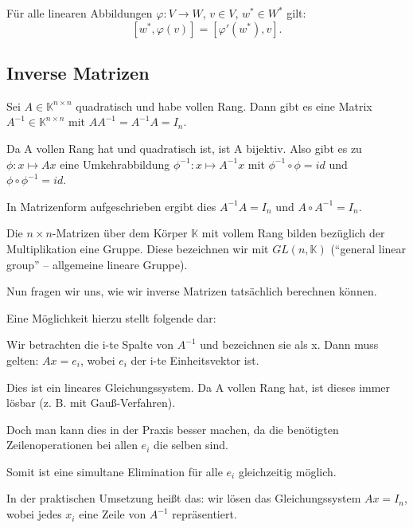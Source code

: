 \documentclass[10pt]{scrbook}
\begin{document}
\begin{Le}
Für alle linearen Abbildungen $\varphi: V\rightarrow W$, $v\in V$, $w^*\in W^*$ gilt:
\begin{equation}
\left[w^*, \varphi(v)\right] = \left[\varphi'(w^*), v\right].
\end{equation}
\end{Le}

\subsection{Inverse Matrizen}

\begin{Sa}
Sei $A\in\mathbb{K}^{n\times n}$ quadratisch und habe vollen Rang. Dann gibt es eine Matrix $A^{-1}\in\mathbb{K}^{n\times n}$ mit $A A^{-1}=A^{-1} A=I_n$.
\end{Sa}
\begin{bew}
Da A vollen Rang hat und quadratisch ist, ist A bijektiv. Also gibt es zu $\phi: x\mapsto A x$ eine Umkehrabbildung $\phi^{-1}: x\mapsto A^{-1} x$ mit $\phi^{-1} \circ \phi=id$ und  $\phi \circ \phi^{-1}=id$.

In Matrizenform aufgeschrieben ergibt dies $A^{-1} A=I_n$ und $A \circ A^{-1}=I_n$.
\end{bew}

\begin{Kor}
Die $n\times n$-Matrizen über dem Körper $\mathbb{K}$ mit vollem Rang bilden bezüglich der Multiplikation eine Gruppe. Diese bezeichnen wir mit $GL(n, \mathbb{K})$ ("`general linear group"' -- allgemeine lineare Gruppe).
\end{Kor}

Nun fragen wir uns, wie wir inverse Matrizen tatsächlich berechnen können.

Eine Möglichkeit hierzu stellt folgende dar:

Wir betrachten die i-te Spalte von $A^{-1}$ und bezeichnen sie als x. Dann muss gelten: $A x=e_i$, wobei $e_i$ der i-te Einheitsvektor ist.

Dies ist ein lineares Gleichungssystem. Da A vollen Rang hat, ist dieses immer lösbar (z. B. mit Gauß-Verfahren).

Doch man kann dies in der Praxis besser machen, da die benötigten Zeilenoperationen bei allen $e_i$ die selben sind.

Somit ist eine simultane Elimination für alle $e_i$ gleichzeitig möglich.

In der praktischen Umsetzung heißt das: wir lösen das Gleichungssystem $A x=I_n$, wobei jedes $x_i$ eine Zeile von $A^{-1}$ repräsentiert.
\end{document}
